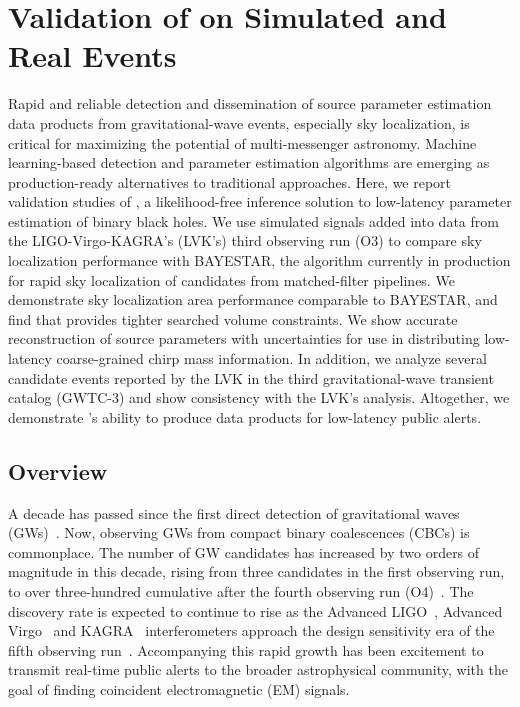 \chapter{Validation of \amplfi on Simulated and Real Events}
\label{chap:amplfi_results}

\begin{refsection}

Rapid and reliable detection and dissemination of source parameter estimation data products from gravitational-wave events, especially sky localization, is critical for maximizing the potential of multi-messenger astronomy. 
Machine learning-based detection and parameter estimation algorithms are emerging as production-ready alternatives to traditional approaches. 
Here, we report validation studies of \amplfi, a likelihood-free inference solution to low-latency parameter estimation of binary black holes. 
We use simulated signals added into data from the LIGO-Virgo-KAGRA's (LVK's) third observing run (O3) to compare sky localization performance with BAYESTAR, the algorithm currently in production for rapid sky localization of candidates from matched-filter pipelines. 
We demonstrate sky localization area performance comparable to BAYESTAR, and find that \amplfi provides tighter searched volume constraints. 
We show accurate reconstruction of source parameters with uncertainties for use in distributing low-latency coarse-grained chirp mass information. In addition, we analyze several candidate events reported by the LVK in the third gravitational-wave transient catalog (GWTC-3) and show consistency with the LVK's analysis. 
Altogether, we demonstrate \amplfi's ability to produce data products for low-latency public alerts.


\section{Overview}  \label{amp_res_sec:intro}
A decade has passed since the first direct detection of gravitational waves (GWs)~\cite{AbEA2016a}. 
Now, observing GWs from compact binary coalescences (CBCs) is commonplace. 
The number of GW candidates has increased by two orders of magnitude in this decade, rising from three candidates in the first observing run, to over three-hundred cumulative after the fourth observing run (O4)~\cite{AbEA2018b, theligoscientificcollaboration2022gwtc21, Abbott_2023, LIGOScientific:2025slb}. 
The discovery rate is expected to continue to rise as the Advanced LIGO~\cite{Aasi_2015}, Advanced Virgo~\cite{Acernese_2015} and KAGRA~\cite{kagra} interferometers approach the design sensitivity era of the fifth observing run~\cite{observing_scenarios}. 
Accompanying this rapid growth has been excitement to transmit real-time public alerts to the broader astrophysical community, with the goal of finding coincident electromagnetic (EM) signals. 


\end{refsection}
